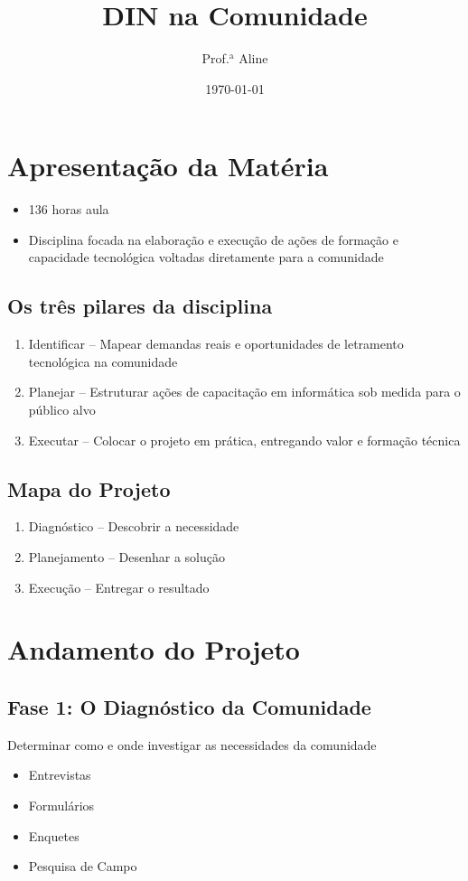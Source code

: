 \documentclass[12pt]{article}
\title{DIN na Comunidade}
\author{Prof.$\mathrm{^a}$ Aline}
\date{\today}
\begin{document}
\maketitle

\section{Apresentação da Matéria}
\begin{itemize}[label=$\rightarrow$]
    \item 136 horas aula
    \item Disciplina focada na elaboração e execução de ações de formação e 
    capacidade tecnológica voltadas diretamente para a comunidade
\end{itemize}

    \subsection{Os três pilares da disciplina}
    \begin{enumerate}
        \item Identificar -- Mapear demandas reais e oportunidades de letramento 
        tecnológica na comunidade
        \item Planejar -- Estruturar ações de capacitação em informática sob medida 
        para o público alvo
        \item Executar -- Colocar o projeto em prática, entregando valor e formação 
        técnica
    \end{enumerate}

    \subsection{Mapa do Projeto}
    \begin{enumerate}
        \item Diagnóstico -- Descobrir a necessidade
        \item Planejamento -- Desenhar a solução
        \item Execução -- Entregar o resultado
    \end{enumerate}

\section{Andamento do Projeto}
    \subsection{Fase 1: O Diagnóstico da Comunidade}
    Determinar como e onde investigar as necessidades da comunidade
    \begin{itemize}[label=--]
        \item Entrevistas
        \item Formulários
        \item Enquetes
        \item Pesquisa de Campo
    \end{itemize}
\end{document}
